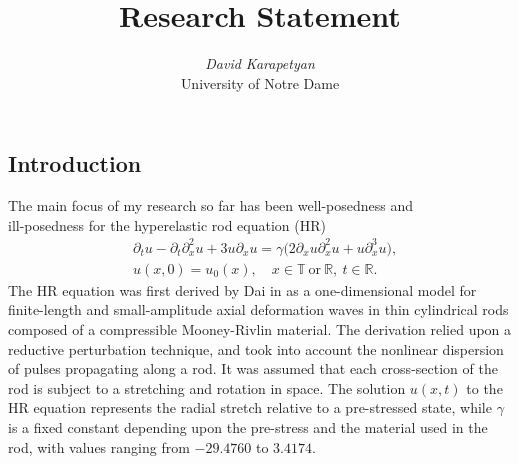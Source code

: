 \documentclass[12pt,reqno]{amsart}
\newcommand{\rr}{\mathbb{R}}
\newcommand{\ci}{\mathbb{T}}
\newcommand{\p}{\partial}
\begin{document}
\title{Research Statement} 
\author{{\it David Karapetyan}\\
    \/ University of Notre Dame}
\maketitle


\parindent0in
\parskip0.1in
%
%
%
\setcounter{section}{0}
%
%
%
%
%
%
%
%
\subsection{Introduction} 
\label{ssec:cur-res}
The main focus of my research so far has been well-posedness and \\ ill-posedness
for the hyperelastic rod equation (HR)
\begin{align}
\label{hr}
& \p_t u
-
\p_t \p_x^2 u
+
3u\p_x u
=
\gamma \big (
2\p_x u \p_x^2 u
+
u \p_x^3 u
\big ),
\\
\label{hr-data} 
& u(x, 0) = u_0 (x),
\quad x  \in \ci \ \text{or} \ \rr, \ t \in \rr.
\end{align}
The HR equation was first derived by Dai in \cite{Dai_1998_Model-equations} as a
one-dimensional model for finite-length and small-amplitude axial deformation
waves in thin cylindrical rods composed of a compressible Mooney-Rivlin
material. The derivation relied upon a reductive perturbation technique, and
took into account the nonlinear dispersion of pulses propagating along a rod. It
was assumed that each cross-section of the rod is subject to a stretching and
rotation in space. The solution $u(x,t)$ to the HR equation represents the
radial stretch relative to a pre-stressed state, while $\gamma$ is a fixed
constant depending upon the pre-stress and the material used in the rod, with
values ranging from $- 29.4760$ to $3.4174$.
\end{document}
